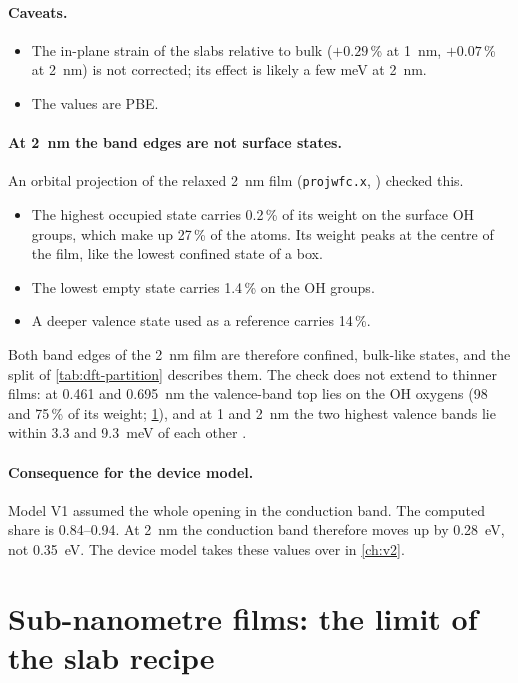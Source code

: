 \paragraph{Caveats.}
\begin{itemize}
\item The in-plane strain of the slabs relative to bulk ($+0.29$\,\% at 1~nm, $+0.07$\,\% at 2~nm) is not corrected;
its effect is likely a few meV at 2~nm.
\item The values are PBE.
\end{itemize}

\paragraph{At 2~nm the band edges are not surface states.} An orbital projection of the relaxed 2~nm film (\texttt{projwfc.x},
) checked this.
\begin{itemize}
\item The highest occupied state carries 0.2\,\% of its weight on the surface OH groups, which make up 27\,\% of the
atoms. Its weight peaks at the centre of the film, like the lowest confined state of a box.
\item The lowest empty state carries 1.4\,\% on the OH groups.
\item A deeper valence state used as a reference carries 14\,\%.
\end{itemize}
Both band edges of the 2~nm film are therefore confined, bulk-like states, and the split of \cref{tab:dft-partition}
describes them. The check does not extend to thinner films: at 0.461 and 0.695~nm the valence-band top lies on the OH
oxygens (98 and 75\,\% of its weight; \cref{sec:mono-dft-thin}), and at 1 and 2~nm the two highest valence bands lie
within 3.3 and 9.3~meV of each other .

\paragraph{Consequence for the device model.} Model V1 assumed the whole opening in the conduction band. The computed
share is 0.84--0.94. At 2~nm the conduction band therefore moves up by 0.28~eV, not 0.35~eV. The device model takes
these values over in \cref{ch:v2}.

\section{Sub-nanometre films: the limit of the slab recipe}
\label{sec:mono-dft-thin}


